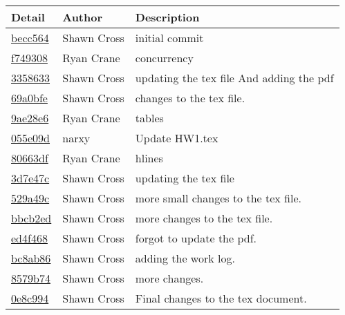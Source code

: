 \begin{tabular}{l l l}\textbf{Detail} & \textbf{Author} & \textbf{Description}\\\hline
\href{https://github.com/crosssh/CS444/commit/becc564dd922e6628b2dd56d838d548952381ba4}{becc564} & Shawn Cross & initial commit\\\hline
\href{https://github.com/crosssh/CS444/commit/f749308a6c02d580b826115e7106b84e01921e39}{f749308} & Ryan Crane & concurrency\\\hline
\href{https://github.com/crosssh/CS444/commit/33586339433712c3e950c83b08b50ec86d3cbe3f}{3358633} & Shawn Cross & updating the tex file And adding the pdf\\\hline
\href{https://github.com/crosssh/CS444/commit/69a0bfe623b7e7683d814cc82f43ad5bfe9c3709}{69a0bfe} & Shawn Cross & changes to the tex file.\\\hline
\href{https://github.com/crosssh/CS444/commit/9ae28e60d49dc47fec5211f4c9e1b1b9c776c909}{9ae28e6} & Ryan Crane & tables\\\hline
\href{https://github.com/crosssh/CS444/commit/055e09d511ce9e24575acd974518b92079fd7a56}{055e09d} & narxy & Update HW1.tex\\\hline
\href{https://github.com/crosssh/CS444/commit/80663df0d3e7639797347ef3528e5fad377b6114}{80663df} & Ryan Crane & hlines\\\hline
\href{https://github.com/crosssh/CS444/commit/3d7e47c63f7f25cd6286e6ed750f65865d61c5eb}{3d7e47c} & Shawn Cross & updating the tex file\\\hline
\href{https://github.com/crosssh/CS444/commit/529a49c02f32c51213db25c71f670797afd33e8d}{529a49c} & Shawn Cross & more small changes to the tex file.\\\hline
\href{https://github.com/crosssh/CS444/commit/bbcb2edf9e0c3c54f31a9901c78dea08601d82b8}{bbcb2ed} & Shawn Cross & more changes to the tex file.\\\hline
\href{https://github.com/crosssh/CS444/commit/ed4f468517b748c050c472d79f8a5708a0b29bae}{ed4f468} & Shawn Cross & forgot to update the pdf.\\\hline
\href{https://github.com/crosssh/CS444/commit/bc8ab8649fb63f33bee3d7b238e4dd4f46c2e669}{bc8ab86} & Shawn Cross & adding the work log.\\\hline
\href{https://github.com/crosssh/CS444/commit/8579b74b79e29e194cea0200df4acd6e87689aaa}{8579b74} & Shawn Cross & more changes.\\\hline
\href{https://github.com/crosssh/CS444/commit/0e8c9948947a7fff711f616d3fcc25015a4a7d51}{0e8c994} & Shawn Cross & Final changes to the tex document.\\\hline

\end{tabular}
